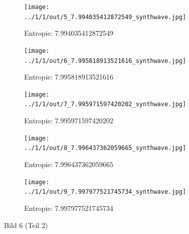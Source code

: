\begin{figure}
	\centering

	\begin{subfigure}{0.25\textwidth}
		\texttt{[image: ../1/1/out/5\_7.994035412872549\_synthwave.jpg]}
		\caption{Entropie: 7.994035412872549}
	\end{subfigure}

	\begin{subfigure}{0.25\textwidth}
		\texttt{[image: ../1/1/out/6\_7.995818913521616\_synthwave.jpg]}
		\caption{Entropie: 7.995818913521616}
	\end{subfigure}

	\begin{subfigure}{0.25\textwidth}
		\texttt{[image: ../1/1/out/7\_7.995971597420202\_synthwave.jpg]}
		\caption{Entropie: 7.995971597420202}
	\end{subfigure}

	\begin{subfigure}{0.25\textwidth}
		\texttt{[image: ../1/1/out/8\_7.996437362059665\_synthwave.jpg]}
		\caption{Entropie: 7.996437362059665}
	\end{subfigure}

	\begin{subfigure}{0.25\textwidth}
		\texttt{[image: ../1/1/out/9\_7.997977521745734\_synthwave.jpg]}
		\caption{Entropie: 7.997977521745734}
	\end{subfigure}

	\caption{Bild 6 (Teil 2)}
\end{figure}

